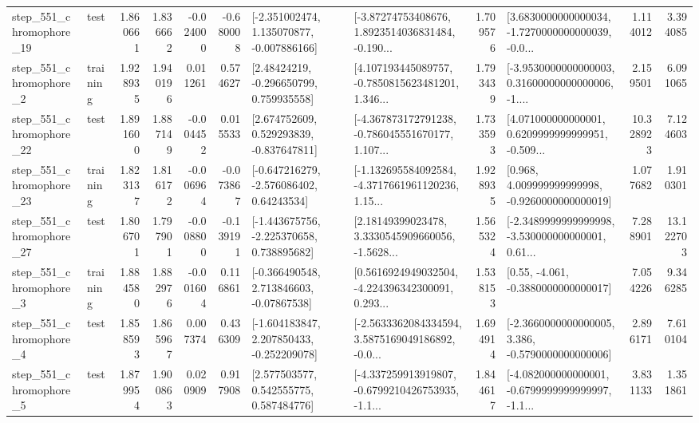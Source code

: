 \begin{tabular}{llrrrrllrlrr}
  step\_551\_chromophore\_19 &      test &      1.860661 &    1.836662 &     -0.024000 & -0.680008 &   [-2.351002474, 1.135070877, -0.007886166] &  [-3.87274753408676, 1.8923514036831484, -0.190... &       1.709576 &  [3.6830000000000034, -1.7270000000000039, -0.0... &            1.114012 &          3.394085 \\
   step\_551\_chromophore\_2 &  training &      1.928935 &    1.940196 &      0.011261 &  0.574627 &     [2.48424219, -0.296650799, 0.759935558] &  [4.107193445089757, -0.7850815623481201, 1.346... &       1.793439 &  [-3.9530000000000003, 0.31600000000000006, -1.... &            2.159501 &          6.091065 \\
  step\_551\_chromophore\_22 &      test &      1.891600 &    1.887149 &     -0.004452 &  0.015533 &    [2.674752609, 0.529293839, -0.837647811] &  [-4.367873172791238, -0.786045551670177, 1.107... &       1.733593 &  [4.071000000000001, 0.6209999999999951, -0.509... &           10.328923 &          7.124603 \\
  step\_551\_chromophore\_23 &  training &      1.823137 &    1.816172 &     -0.006964 & -0.073867 &    [-0.647216279, -2.576086402, 0.64243534] &  [-1.132695584092584, -4.3717661961120236, 1.15... &       1.928935 &    [0.968, 4.009999999999998, -0.9260000000000019] &            1.077682 &          1.910301 \\
  step\_551\_chromophore\_27 &      test &      1.806701 &    1.797901 &     -0.008800 & -0.139191 &   [-1.443675756, -2.225370658, 0.738895682] &  [2.18149399023478, 3.3330545909660056, -1.5628... &       1.565324 &  [-2.3489999999999998, -3.530000000000001, 0.61... &            7.288901 &         13.122703 \\
   step\_551\_chromophore\_3 &  training &      1.884580 &    1.882976 &     -0.001604 &  0.116861 &    [-0.366490548, 2.713846603, -0.07867538] &  [0.5616924949032504, -4.224396342300091, 0.293... &       1.538153 &                [0.55, -4.061, -0.3880000000000017] &            7.054226 &          9.346285 \\
   step\_551\_chromophore\_4 &      test &      1.858593 &    1.865967 &      0.007374 &  0.436309 &   [-1.604183847, 2.207850433, -0.252209078] &  [-2.5633362084334594, 3.5875169049186892, -0.0... &       1.694914 &  [-2.3660000000000005, 3.386, -0.5790000000000006] &            2.896171 &          7.610104 \\
   step\_551\_chromophore\_5 &      test &      1.879954 &    1.900863 &      0.020909 &  0.917908 &     [2.577503577, 0.542555775, 0.587484776] &  [-4.337259913919807, -0.6799210426753935, -1.1... &       1.844617 &  [-4.082000000000001, -0.6799999999999997, -1.1... &            3.831133 &          1.351861 \\

\end{tabular}
